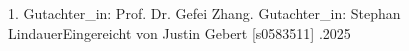 \begin{titlepage}
\begin{center}
        1. Gutachter\_in: Prof. Dr. Gefei Zhang. Gutachter\_in: Stephan Lindauer\linebreak[4]
        \linebreak[4]
        \linebreak[4]
        \linebreak[4]
        \linebreak[4]
        Eingereicht von Justin Gebert [s0583511]
        \linebreak[4]
        \linebreak[4]
        \linebreak[4]
        .2025
    \end{center}
\end{titlepage}